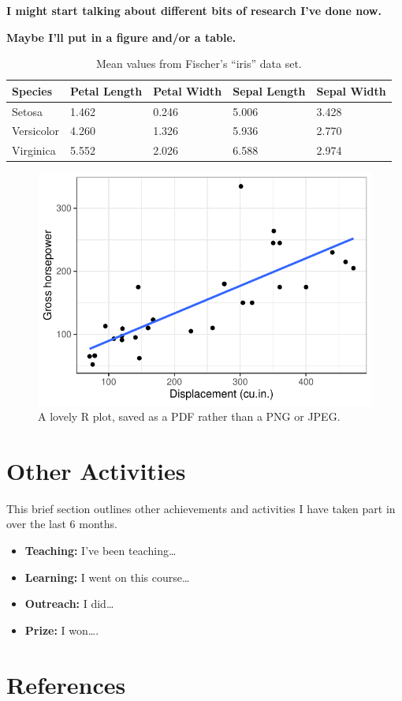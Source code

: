 \documentclass[12pt]{article}
\begin{document}
\textbf{I might start talking about different bits of research I've done now.} \lipsum[5]

\textbf{Maybe I'll put in a figure and/or a table.}

\begin{table}[bht]
    \centering
    \begin{tabularx}{\linewidth}{lXXXX}
        \toprule
        \textbf{Species} & \textbf{Petal Length} & \textbf{Petal Width} & \textbf{Sepal Length} & \textbf{Sepal Width} \\ 
        \midrule
        Setosa & 1.462 & 0.246 & 5.006 & 3.428 \\ 
        Versicolor & 4.260 & 1.326 & 5.936 & 2.770 \\ 
        Virginica & 5.552 & 2.026 & 6.588 & 2.974 \\ 
        \bottomrule
    \end{tabularx}
    \caption{Mean values from Fischer's ``iris'' data set.}
    \label{tab:wide_tab}
\end{table}

\begin{figure}[bht]
    \centering
    \includegraphics[width=.7\linewidth]{figures/myplot.pdf}
    \caption{A lovely R plot, saved as a PDF rather than a PNG or JPEG.}
    \label{fig:mtcars}
\end{figure}

\newpage\section{Other Activities}\label{sec:other}

This brief section outlines other achievements and activities I have taken part in over the last 6 months.

\begin{itemize}
    \item \textbf{Teaching:} I've been teaching\dots
    \item \textbf{Learning:} I went on this course\dots
    \item \textbf{Outreach:} I did\dots
    \item \textbf{Prize:} I won\dots.
\end{itemize}

\newpage\section{References}
{\RaggedRight\sloppy
\printbibliography[heading = none]}
\end{document}
